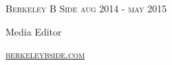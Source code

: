 {
  \textsc{\small{Berkeley B Side
      \hfill
      {\raggedleft
        aug 2014 - may 2015
      }
    }
  }

  {\raggedright\large {
    Media Editor
  } \\}

  \textsc{\small\href{http://berkeleybside.com}{berkeleybside.com}}

  \vspace{8pt}
}
